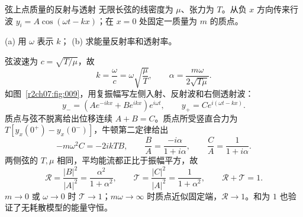 \begin{practicebox}{弦上点质量的反射与透射}
无限长弦的线密度为 $\mu$、张力为 $T$。从负 $x$ 方向传来行波
$y_i=A\cos(\omega t-kx)$；在 $x=0$ 处固定一质量为 $m$ 的质点。

(a) 用 $\omega$ 表示 $k$；
(b) 求能量反射率和透射率。
\label{r2ch07:pr:002}
\begin{solution}
弦波速为 $c=\sqrt{T/\mu}$，故
\begin{equation}
 k=\frac\omega c=\omega\sqrt{\frac\mu T},\qquad
 \alpha=\frac{m\omega}{2\sqrt{T\mu}}.
 \label{r2ch07:eq:029}
\end{equation}
如图~\ref{r2ch07:fig:009}，用复振幅写左侧入射、反射波和右侧透射波：
\[
 y_-=(Ae^{-ikx}+Be^{ikx})e^{i\omega t},\qquad
 y_+=Ce^{i(\omega t-kx)}.
\]
质点与弦不脱离给出位移连续 $A+B=C$。质点所受竖直合力为
$T[y_x(0^+)-y_x(0^-)]$，牛顿第二定律给出
\begin{equation}
 -m\omega^2C=-2ikTB,\qquad
 \frac BA=\frac{-i\alpha}{1+i\alpha},\qquad
 \frac CA=\frac1{1+i\alpha}.
 \label{r2ch07:eq:030}
\end{equation}
两侧弦的 $T,\mu$ 相同，平均能流都正比于振幅平方，故
\begin{equation}
 \boxed{\mathcal R=\frac{|B|^2}{|A|^2}=\frac{\alpha^2}{1+\alpha^2}},
 \qquad
 \boxed{\mathcal T=\frac{|C|^2}{|A|^2}=\frac1{1+\alpha^2}},
 \qquad \mathcal R+\mathcal T=1.
 \label{r2ch07:eq:031}
\end{equation}
$m\to0$ 或 $\omega\to0$ 时 $\mathcal T\to1$；$m\omega\to\infty$ 时质点近似固定端，$\mathcal R\to1$。和为 $1$ 也验证了无耗散模型的能量守恒。
\figPointScatter
\end{solution}
\end{practicebox}

